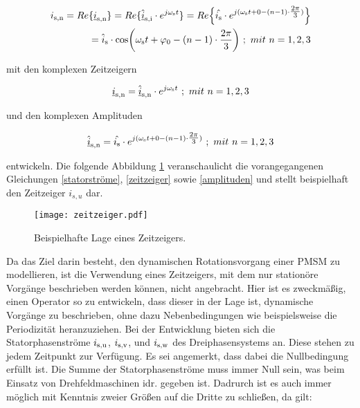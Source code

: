 \begin{align}
	\begin{split}
    i_\i{s,n} = Re\{\underline{i}_\i{s,n}\} = Re\{\underline{\hat i}_\i{s,i}\cdot e^{j\omega_\i{s}t}\} = Re\Bigl\{\hat{i_\i{s}}\cdot e^{j(\omega_\i{s}t+0-(n-1)\cdot\tfrac{2\pi}{3})}\Bigr\}
	\\=\hat{i}_\i{s}\cdot\si{cos}\bigg(\omega_\i{s}t+\varphi_\i{0}-(n-1)\cdot\frac{2\pi}{3}\bigg)~;~mit~n=1,2,3 \label{statorströme} 
\end{split}
\end{align}

mit den komplexen Zeitzeigern

\begin{align}
	\underline{i}_\i{s,n} = \underline{\hat i}_\i{s,n}\cdot e^{j\omega_\i{s}t}~;~mit~n=1,2,3 \label{zeitzeiger}
\end{align}

und den komplexen Amplituden

\begin{align}
	\underline{\hat i}_\i{s,n} = \hat{i_\i{s}}\cdot e^{j(\omega_\i{s}t+0-(n-1)\cdot\tfrac{2\pi}{3})}~;~mit~n=1,2,3 \label{amplituden}
\end{align}

entwickeln. 
Die folgende Abbildung \ref{fig:zeitzeiger} veranschaulicht die vorangegangenen Gleichungen \ref{statorströme}, \ref{zeitzeiger} sowie \ref{amplituden} und stellt beispielhaft den Zeitzeiger $i_{s,u}$ dar.

\begin{figure}[h]
	\centering
	\texttt{[image: zeitzeiger.pdf]}
	\label{fig:zeitzeiger}
	\caption{Beispielhafte Lage eines Zeitzeigers.}
\end{figure}

Da das Ziel darin besteht, den dynamischen Rotationsvorgang einer PMSM zu modellieren, ist die Verwendung eines Zeitzeigers, mit dem nur stationöre Vorgänge beschrieben werden können, nicht angebracht. 
Hier ist es zweckmäßig, einen Operator so zu entwickeln, dass dieser in der Lage ist, dynamische Vorgänge zu beschrieben, ohne dazu Nebenbedingungen wie beispielsweise die Periodizität heranzuziehen. 
Bei der Entwicklung bieten sich die Statorphasenströme $i_\i{s,u}$, $i_\i{s,v}$, und $i_\i{s,w}$ des Dreiphasensystems an.
Diese stehen zu jedem Zeitpunkt zur Verfügung. 
Es sei angemerkt, dass dabei die Nullbedingung erfüllt ist. 
Die Summe der Statorphasenströme muss immer Null sein, was beim Einsatz von Drehfeldmaschinen idr. gegeben ist.
Dadrurch ist es auch immer möglich mit Kenntnis zweier Größen auf die Dritte zu schließen, da gilt:


